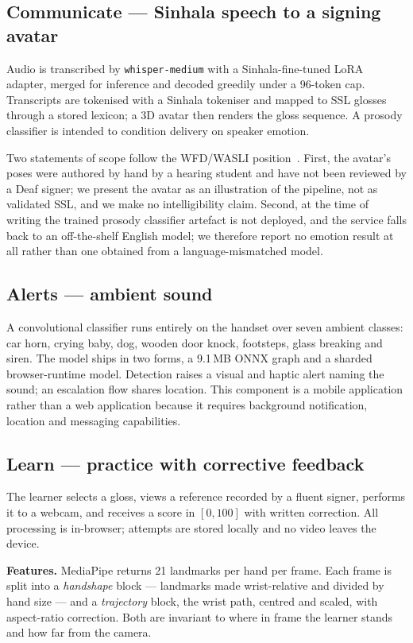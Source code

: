 \documentclass[conference]{IEEEtran}
\begin{document}
\subsection{Communicate --- Sinhala speech to a signing avatar}
\label{sec:communicate}
Audio is transcribed by \texttt{whisper-medium} with a Sinhala-fine-tuned LoRA
adapter, merged for inference and decoded greedily under a 96-token cap.
Transcripts are tokenised with a Sinhala tokeniser and mapped to SSL glosses
through a stored lexicon; a 3D avatar then renders the gloss sequence. A
prosody classifier is intended to condition delivery on speaker emotion.

Two statements of scope follow the WFD/WASLI
position~\cite{wfdwasli2018avatars}. First, the avatar's poses were authored
by hand by a hearing student and have not been reviewed by a Deaf signer; we
present the avatar as an illustration of the pipeline, not as validated SSL,
and we make no intelligibility claim. Second, at the time of writing the
trained prosody classifier artefact is not deployed, and the service falls
back to an off-the-shelf English model; we therefore report no emotion result
at all rather than one obtained from a language-mismatched model.

\subsection{Alerts --- ambient sound}
A convolutional classifier runs entirely on the handset over seven ambient
classes: car horn, crying baby, dog, wooden door knock, footsteps, glass
breaking and siren. The model ships in two forms, a 9.1\,MB ONNX graph and a
sharded browser-runtime model. Detection raises a visual and haptic alert
naming the sound; an escalation flow shares location. This component is a
mobile application rather than a web application because it requires
background notification, location and messaging capabilities.

\subsection{Learn --- practice with corrective feedback}
\label{sec:learn}
The learner selects a gloss, views a reference recorded by a fluent signer,
performs it to a webcam, and receives a score in $[0,100]$ with written
correction. All processing is in-browser; attempts are stored locally and no
video leaves the device.

\textbf{Features.} MediaPipe returns 21 landmarks per hand per frame. Each
frame is split into a \emph{handshape} block --- landmarks made wrist-relative
and divided by hand size --- and a \emph{trajectory} block, the wrist path,
centred and scaled, with aspect-ratio correction. Both are invariant to where
in frame the learner stands and how far from the camera.
\end{document}
